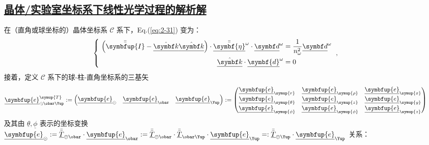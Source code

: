 \subsection{\protect\hyperlink{chap:\thesubsection}{晶体/实验室坐标系下线性光学过程的解析解}}
\label{晶体/实验室坐标系下线性光学过程的解析解}

在（直角或球坐标的）晶体坐标系 $\mathcal{C}$ 系下，Eq.(\ref{eq:2-31}) 变为：
\begin{equation} \label{eq:2-42}
	\left\{\ \begin{aligned} \left( \bar{\bar{\symbfup{I}}} - \hat{\underline{\symbf k}} \hat{\underline{\symbf k}} \right) \cdot \bar{\bar{\underline{\symbf{\eta}}}}^{\omega} \cdot \underline{\symbf d}^{\omega} &= \frac{ 1 }{ n^2_\omega } \underline{\symbf d}^{\omega} \\ \hat{\underline{\symbf k}} \cdot \underline{\symbf{d}}^{\omega} &= 0 \end{aligned}\right. ~,
\end{equation}
接着，定义 $\mathcal{C}$ 系下的球-柱-直角坐标系的三基矢
\begin{equation} \label{eq:2-43}
    \underline{\symbfup{e}}_{\circleddash\obar\Yup}^{\symup{T}} := \begin{pmatrix} \underline{\symbfup{e}}_{\circleddash} & \underline{\symbfup{e}}_{\obar} & \underline{\symbfup{e}}_{\Yup} \end{pmatrix} := \begin{pmatrix} \underline{\symbfup{e}}_{{\symup{r}}} & \underline{\symbfup{e}}_{{\symup{\rho}}} & \underline{\symbfup{e}}_{{\symup{x}}} \\ \underline{\symbfup{e}}_{{\symup{\theta}}} & \underline{\symbfup{e}}_{{\symup{z}}} & \underline{\symbfup{e}}_{{\symup{y}}} \\ \underline{\symbfup{e}}_{{\symup{\phi}}} & \underline{\symbfup{e}}_{{\symup{\phi}}} & \underline{\symbfup{e}}_{{\symup{z}}} \end{pmatrix}
\end{equation}
及其由 $\underline{\theta},\underline{\phi}$ 表示的坐标变换 $\underline{\symbfup{e}}_{\circleddash} := \bar{\bar{\underline{T}}}_{\circleddash\obar} \cdot \underline{\symbfup{e}}_{\obar} := \bar{\bar{\underline{T}}}_{\circleddash\obar} \cdot \bar{\bar{\underline{T}}}_{\obar\Yup} \cdot \underline{\symbfup{e}}_{\Yup} =: \bar{\bar{\underline{T}}}_{\circleddash\Yup} \cdot \underline{\symbfup{e}}_{\Yup}$ 关系：
